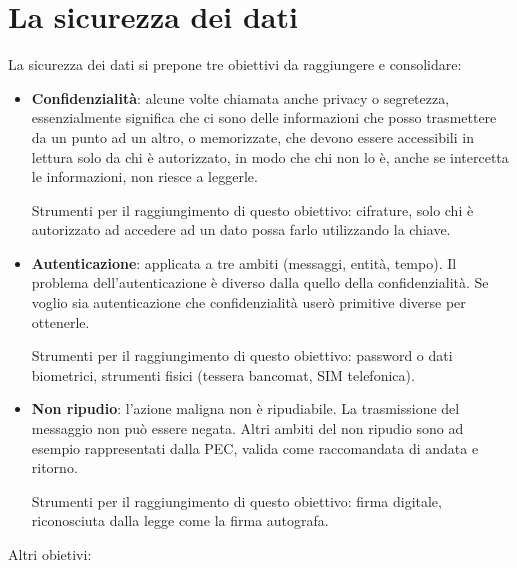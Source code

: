\section{La sicurezza dei dati}
La sicurezza dei dati si prepone tre obiettivi da raggiungere e consolidare:
\begin{itemize}
    \item \textbf{Confidenzialità}: alcune volte chiamata anche privacy o segretezza, essenzialmente significa che ci sono delle informazioni che posso trasmettere da un punto ad un altro, o memorizzate, che devono essere accessibili in lettura solo da chi è autorizzato, in modo che chi non lo è, anche se intercetta le informazioni, non riesce a leggerle. 
    
    \vspace{5mm}
    
    Strumenti per il raggiungimento di questo obiettivo: cifrature, solo chi è autorizzato ad accedere ad un dato possa farlo utilizzando la chiave. 
    \item \textbf{Autenticazione}: applicata a tre ambiti (messaggi, entità, tempo). Il problema dell'autenticazione è diverso dalla quello della confidenzialità. Se voglio sia autenticazione che confidenzialità userò primitive diverse per ottenerle. 
    
    \vspace{5mm}
    Strumenti per il raggiungimento di questo obiettivo: password o dati biometrici, strumenti fisici (tessera bancomat, SIM telefonica).
    \item \textbf{Non ripudio}: l’azione maligna non è ripudiabile. La trasmissione del messaggio non può essere negata. Altri ambiti del non ripudio sono ad esempio rappresentati dalla PEC, valida come raccomandata di andata e ritorno.
    
    \vspace{5mm}
     Strumenti per il raggiungimento di questo obiettivo: firma digitale, riconosciuta dalla legge come la firma autografa. 
\end{itemize}
Altri obietivi:
